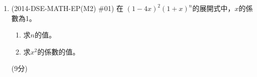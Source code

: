 \documentclass[12pt]{article}
\begin{document}
\begin{enumerate}
        \hrulefill
        
        \hrulefill
        
        \hrulefill
        
        \hrulefill
        
        \hrulefill
        
        \hrulefill
        
        \hrulefill
        
        \hrulefill
        
        \hrulefill
        
        \hrulefill
        
        \hrulefill
        
        \hrulefill
        
        \hrulefill
        
        \hrulefill
        
        \hrulefill
        
        \hrulefill
        
        \hrulefill
        
        \hrulefill
        
        \hrulefill
        
        \hrulefill
        
        \hrulefill
        
        \hrulefill
        
        \hrulefill

    \pagebreak
        \item (2014-DSE-MATH-EP(M2) \#01) 在 $(1-4x)^2(1+x)^n$的展開式中，$x$的係數為1。\begin{enumerate}
            \item 求$n$的值。
            \item 求$x^2$的係數的值。
        \end{enumerate}\hfill(9分)
            
            \hrulefill
            
            \hrulefill
            
            \hrulefill
            
            \hrulefill
            
            \hrulefill
            
            \hrulefill
            
            \hrulefill
            
            \hrulefill
            

\end{enumerate}
\end{document}
